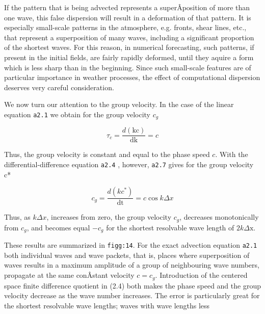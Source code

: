 If the pattern that is being advected represents a superÂ­position of
more than one wave, this false dispersion will result in a deformation
of that pattern. It is especially small-scale patterns in the
atmosphere, e.g. fronts, shear lines, etc., that represent a
superposition of many waves, including a significant proportion of the
shortest waves. For this reason, in numerical forecasting, such
patterns, if present in the initial fields, are fairly rapidly deformed,
until they aquire a form which is less sharp than in the beginning.
Since such small-scale features are of particular importance in weather
processes, the effect of computational dispersion deserves very careful
consideration.

We now turn our attention to the group velocity. In the case of the
linear equation \texttt{a2.1} we obtain for the group velocity \(c_{g}\)

 {\[\tau_{c} = \frac{d\left( \text{kc} \right)}{\text{dk}} = c\]}

Thus, the group velocity is constant and equal to the phase speed \(c\).
With the differential-difference equation \texttt{a2.4} , however,
\texttt{a2.7} gives for the group velocity c*

 {\[c_{g} = \frac{d\left( kc^{*} \right)}{\text{dt}} = c\cos{k\Delta x}\]}

Thus, as \(k\Delta x\), increases from zero, the group velocity
\(c_{g}\), decreases monotonically from \(c_{g}\), and becomes equal
\({- c}_{g}\) for the shortest resolvable wave length of
\(2k\Delta\text{x.}\)

These results are summarized in \texttt{figg:14}. For the exact
advection equation \texttt{a2.1} both individual waves and wave packets,
that is, places where superposition of waves results in a maximum
amplitude of a group of neighbouring wave numbers, propagate at the same
conÂ­stant velocity \(c = c_{g}\). Introduction of the centered space
finite difference quotient in (2.4) both makes the phase speed and the
group velocity decrease as the wave number increases. The error is
particularly great for the shortest resolvable wave lengths; waves with
wave lengths less

